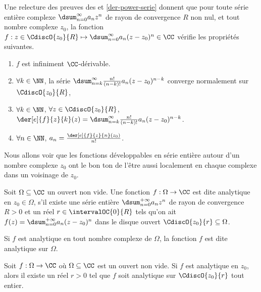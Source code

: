\begin{remark} \label{der-power-serie-gene}
	Une relecture des preuves des  et \ref{der-power-serie} donnent que pour toute série entière complexe $\dsum_{n=0}^{\infty} a_n z^n$ de rayon de convergence $R$ non nul,
	et tout nombre complexe $z_0$,
	la fonction $f: z \in \CdiscO{z_0}{R} \mapsto \dsum_{n=0}^{\infty} a_n (z - z_0)^n \in \CC$ vérifie les propriétés suivantes.
    \begin{enumerate}
    	\item $f$ est infiniment $\CC$-dérivable.

    	\item $\forall k \in \NN$,
		la série $\dsum_{n = k}^{\infty} \frac{n!}{(n-k)!} a_n (z - z_0)^{n - k}$ converge normalement sur $\CdiscO{z_0}{R}$,

    	\item $\forall k \in \NN$, $\forall z \in \CdiscO{z_0}{R}$,
		$\der[e]{f}{z}{k}(z) = \dsum_{n = k}^{\infty} \frac{n!}{(n-k)!} a_n (z - z_0)^{n - k}$.

    	\item $\forall n \in \NN$, $a_n = \frac{\der[e]{f}{z}{n}(z_0)}{n!}$.
    \end{enumerate}
\end{remark}




Nous allons voir que les fonctions développables en série entière autour d'un nombre complexe $z_0$ ont le bon ton de l'être aussi localement en chaque complexe dans un voisinage de $z_0$.


\begin{defi} \label{def-analytic}
    Soit $\Omega \subseteq \CC$ un ouvert non vide.
	Une fonction $f: \Omega \rightarrow \CC$ est dite analytique en $z_0 \in \Omega$, 
	s'il existe
	une série entière $\dsum_{n = 0}^{+\infty} a_n z^n$
	de rayon de convergence $R > 0$
	et
	un réel $r \in \intervalOC{0}{R}$ tels qu'on ait
	$f(z) = \dsum_{n = 0}^{+\infty} a_n (z - z_0)^n$
	dans le disque ouvert $\CdiscO{z_0}{r} \subseteq \Omega$.

	\smallskip
	
	Si $f$ est analytique en tout nombre complexe de $\Omega$,
	la fonction $f$ est dite analytique sur $\Omega$.
\end{defi}




\begin{fact} \label{power-serie-vs-analytic}
    Soit $f: \Omega \rightarrow \CC$ où $\Omega \subseteq \CC$ est un ouvert non vide.
    Si $f$ est analytique en $z_0$,
	alors
	il existe un réel $r > 0$ tel que $f$ soit analytique sur $\CdiscO{z_0}{r}$ tout entier. 
\end{fact}


